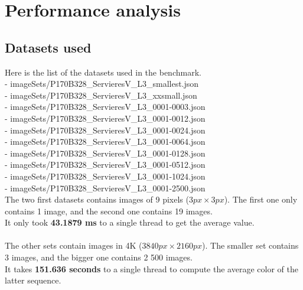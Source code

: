 \section{Performance analysis}
\subsection{Datasets used}
Here is the list of the datasets used in the benchmark.\\
- imageSets/P170B328\_ServieresV\_L3\_smallest.json\\
- imageSets/P170B328\_ServieresV\_L3\_xxsmall.json\\
- imageSets/P170B328\_ServieresV\_L3\_0001-0003.json\\
- imageSets/P170B328\_ServieresV\_L3\_0001-0012.json\\
- imageSets/P170B328\_ServieresV\_L3\_0001-0024.json\\
- imageSets/P170B328\_ServieresV\_L3\_0001-0064.json\\
- imageSets/P170B328\_ServieresV\_L3\_0001-0128.json\\
- imageSets/P170B328\_ServieresV\_L3\_0001-0512.json\\
- imageSets/P170B328\_ServieresV\_L3\_0001-1024.json\\
- imageSets/P170B328\_ServieresV\_L3\_0001-2500.json\\

The two first datasets contains images of 9 pixels ($3px \times 3px$). The first one only contains 1 image, and the second one contains 19 images.\\
It only took \textbf{43.1879 ms} to a single thread to get the average value.\\
\\
The other sets contain images in 4K ($3840px \times 2160px$). The smaller set contains 3 images, and the bigger one contains 2 500 images.\\
It takes \textbf{151.636 seconds} to a single thread to compute the average color of the latter sequence.\\

